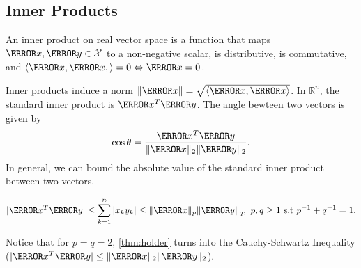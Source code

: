 \subsection{Inner Products}
\begin{definition}
  An inner product on real vector space is a function that maps $\V{x},\V{y} \in \mathcal{X}$ to a non-negative scalar, is distributive, is commutative, and $\langle \V{x}, \V{x}, \rangle = 0 \Leftrightarrow \V{x}=0$.
  \label{defn:inner-product}
\end{definition}
Inner products induce a norm $\|\V{x}\| = \sqrt{\langle \V{x}, \V{x} \rangle}$.
In $\mathbb{R}^n$, the standard inner product is $\V{x}^T\V{y}$.
The angle bewteen two vectors is given by
\[
	\cos\theta = \frac{\V{x}^T\V{y}}{\|\V{x}\|_2\|\V{y}\|_2}.
\]
In general, we can bound the absolute value of the standard inner product between two vectors.
\begin{theorem}
  \[
	|\V{x}^T\V{y}| \leq \sum_{k=1}^n |x_ky_k| \leq \|\V{x}\|_p\|\V{y}\|_q,\ p, q\geq 1 \text{ s.t } p^{-1}+q^{-1}=1.
  \]
  \label{thm:holder}
\end{theorem}
Notice that for $p=q = 2$, \cref{thm:holder} turns into the Cauchy-Schwartz Inequality ($|\V{x}^T\V{y}| \leq \|\V{x}\|_2\|\V{y}\|_2$).

